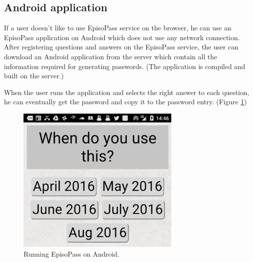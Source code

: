 \documentclass{article}
\begin{document}

\subsection{Android application}



If a user doesn't like to use EpisoPass service on the browser,
he can use an EpisoPass application on Android
which does not use any network connection.
After registering questions and answers on the EpisoPass service,
the user can download an Android application from the server
which contain all the information required for generating passwords.
(The application is compiled and built on the server.)


When the user runs the application and selects the right answer
to each question, he can eventually get the password and copy it to the password entry.
(Figure \ref{android1})


\begin{figure}[H]
\includegraphics[width=80mm,bb=-30 0 399 386]{figures/429eec261024dc6c85351f51c12f09b4.png}
\caption{Running EpisoPass on Android.}
\label{android1}
\end{figure}
\end{document}

